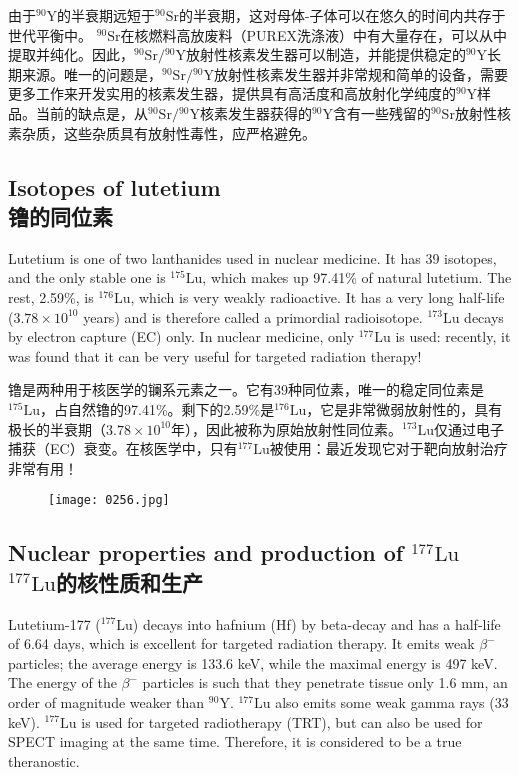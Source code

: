 \documentclass[dvipsnames, svgnames,a4paper,11pt]{article}
\begin{document}
由于\(\mathrm{^{90}Y}\)的半衰期远短于\(\mathrm{^{90}Sr}\)的半衰期，这对母体-子体可以在悠久的时间内共存于世代平衡中。 \(\mathrm{^{90}Sr}\)在核燃料高放废料（PUREX洗涤液）中有大量存在，可以从中提取并纯化。因此，\(\mathrm{^{90}Sr}/\mathrm{^{90}Y}\)放射性核素发生器可以制造，并能提供稳定的\(\mathrm{^{90}Y}\)长期来源。唯一的问题是，\(\mathrm{^{90}Sr}/\mathrm{^{90}Y}\)放射性核素发生器并非常规和简单的设备，需要更多工作来开发实用的核素发生器，提供具有高活度和高放射化学纯度的\(\mathrm{^{90}Y}\)样品。当前的缺点是，从\(\mathrm{^{90}Sr}/\mathrm{^{90}Y}\)核素发生器获得的\(\mathrm{^{90}Y}\)含有一些残留的\(\mathrm{^{90}Sr}\)放射性核素杂质，这些杂质具有放射性毒性，应严格避免。

\subsection{Isotopes of lutetium\\ 镥的同位素}  
Lutetium is one of two lanthanides used in nuclear medicine. It has 39 isotopes, and the only stable one is \(\mathrm{^{175}Lu}\), which makes up 97.41\% of natural lutetium. The rest, 2.59\%, is \(\mathrm{^{176}Lu}\), which is very weakly radioactive. It has a very long half-life (\(3.78 \times 10^{10}\) years) and is therefore called a primordial radioisotope. \(\mathrm{^{173}Lu}\) decays by electron capture (EC) only. In nuclear medicine, only \(\mathrm{^{177}Lu}\) is used: recently, it was found that it can be very useful for targeted radiation therapy!

镥是两种用于核医学的镧系元素之一。它有39种同位素，唯一的稳定同位素是\(\mathrm{^{175}Lu}\)，占自然镥的97.41\%。剩下的2.59\%是\(\mathrm{^{176}Lu}\)，它是非常微弱放射性的，具有极长的半衰期（\(3.78 \times 10^{10}\)年），因此被称为原始放射性同位素。\(\mathrm{^{173}Lu}\)仅通过电子捕获（EC）衰变。在核医学中，只有\(\mathrm{^{177}Lu}\)被使用：最近发现它对于靶向放射治疗非常有用！

\begin{figure}[h]
	\centering
    \texttt{[image: 0256.jpg]}  
     \label{fig344}
\end{figure}


\subsection{Nuclear properties and production of \(\mathrm{^{177}Lu}\)\\ \(\mathrm{^{177}Lu}\)的核性质和生产}  
Lutetium-177 (\(\mathrm{^{177}Lu}\)) decays into hafnium (Hf) by beta-decay and has a half-life of 6.64 days, which is excellent for targeted radiation therapy. It emits weak \(\beta^-\) particles; the average energy is 133.6 keV, while the maximal energy is 497 keV. The energy of the \(\beta^-\) particles is such that they penetrate tissue only 1.6 mm, an order of magnitude weaker than \(\mathrm{^{90}Y}\). \(\mathrm{^{177}Lu}\) also emits some weak gamma rays (33 keV). \(\mathrm{^{177}Lu}\) is used for targeted radiotherapy (TRT), but can also be used for SPECT imaging at the same time. Therefore, it is considered to be a true theranostic.  
\end{document}
